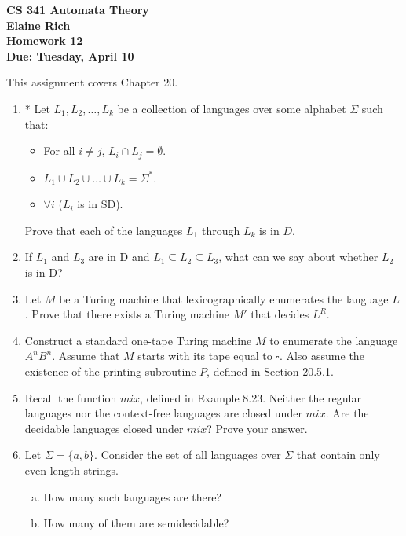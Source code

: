 \documentclass[10pt]{article}
\begin{document}
\begin{center}
\textbf{
CS 341 Automata Theory \\
Elaine Rich \\
Homework 12 \\
Due: Tuesday, April 10}\\
\end{center}
\noindent
This assignment covers Chapter 20.\\

\begin{enumerate}[1)]


\item
* Let $L_1, L_2, \ldots , L_k$ be a collection of languages over some alphabet $\Sigma$ such that:
\begin{itemize}
\item
For all $i \neq j$, $L_i \cap L_j = \emptyset$.
\item
$L_1 \cup L_2 \cup \dots \cup L_k = \Sigma ^*$.
\item
$\forall i$ ($L_i$ is in SD).
\end{itemize}
Prove that each of the languages $L_1$ through $L_k$ is in $D$.


\item
If $L_1$ and $L_3$ are in D and $L_1 \subseteq L_2 \subseteq L_3$, what can we say about whether $L_2$ is in D?


\item
Let $M$ be a Turing machine that lexicographically enumerates the language $L$. Prove that there exists a Turing
machine $M'$ that decides $L^R$.



\item
Construct a standard one-tape Turing machine $M$ to enumerate the language $A^nB^n$. Assume that $M$ starts with
its tape equal to $\square$. Also assume the existence of the printing subroutine $P$, defined in Section 20.5.1.


\item
Recall the function $mix$, defined in Example 8.23. Neither the regular languages nor the context-free languages
are closed under $mix$. Are the decidable languages closed under $mix$? Prove your answer.


\item
Let $\Sigma = \{a, b\}$. Consider the set of all languages over $\Sigma$ that contain only even length strings.
\begin{enumerate}[a)]
\item
How many such languages are there?

\item
How many of them are semidecidable?
\end{enumerate}
\end{enumerate}
\end{document}

